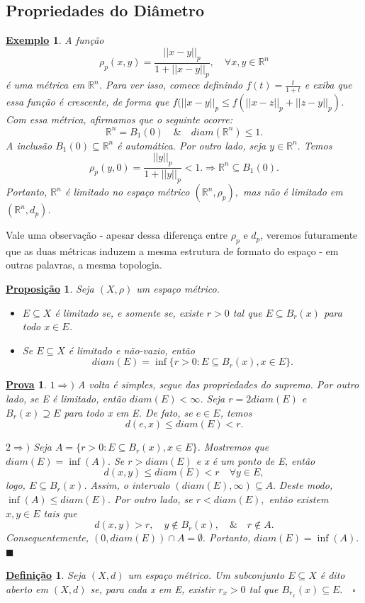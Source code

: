 \documentclass{article}
\newtheorem*{def*}{\underline{Defini\c c\~ao}}
\newtheorem*{prop*}{\underline{Proposi\c c\~ao}}
\newtheorem{example}{\underline{Exemplo}}
\newtheorem*{proof*}{\underline{Prova}}
\renewcommand\qedsymbol{$\blacksquare$}
\begin{document}
\subsection{Propriedades do Diâmetro}
 \begin{example}
   A função 
     \[
       \rho_{p}(x,y) = \frac{||x-y||_{p}}{1+||x-y||_{p}},\quad \forall x, y\in \mathbb{R}^{n}
     \]
     é uma métrica em \(\mathbb{R}^{n}\). Para ver isso, comece definindo \(f(t) = \frac{t}{1+t}\) e exiba que essa função é
crescente, de forma que \(f(||x-y||_{p}\leq f(||x-z||_{p}+||z-y||_{p})\). Com essa métrica, afirmamos que o seguinte ocorre: 
  \[
    \mathbb{R}^{n} = B_{1}(0)\quad\&\quad diam(\mathbb{R}^{n})\leq 1.
  \]
  A inclusão \(B_{1}(0)\subseteq{\mathbb{R}^{n}}\) é automática. Por outro lado, seja \(y\in \mathbb{R}^{n}.\) Temos 
    \[
      \rho_{p}(y, 0) = \frac{||y||_{p}}{1 + ||y||_{p}} < 1. \Rightarrow \mathbb{R}^{n}\subseteq{B_{1}(0)}.
    \]
  Portanto, \(\mathbb{R}^{n}\) é limitado no espaço métrico \((\mathbb{R}^{n}, \rho_{p}),\) mas não é limitado em \((\mathbb{R}^{n}, d_{p})\).
 \end{example}
 Vale uma observação - apesar dessa diferença entre \(\rho_{p}\) e \(d_{p}\), veremos futuramente que as duas métricas induzem a mesma
estrutura de formato do espaço - em outras palavras, a mesma topologia.
\begin{prop*}
  Seja \((X, \rho )\) um espaço métrico.
 \begin{itemize}
   \item[1)] \(E\subseteq{X}\) é limitado se, e somente se, existe \(r>0\) tal que \(E\subseteq{B_{r}(x)}\) para todo \(x\in E\).
     \item[2)] Se \(E\subseteq{X}\) é limitado e não-vazio, então 
       \[
         diam(E) = \inf\{r > 0: E \subseteq{B_{r}(x)}, x \in E\}.
       \]
 \end{itemize}
\end{prop*}
\begin{proof*}
  \(1 \Rightarrow )\) A volta é simples, segue das propriedades do supremo. Por outro lado, se E é limitado, então \(diam(E) < \infty\). Seja
 \(r=2diam(E)\) e \(B_{r}(x)\supseteq{E}\) para todo x em E. De fato, se \(e\in E\), temos 
   \[
     d(e, x)\leq diam(E) < r.
   \]

   \(2 \Rightarrow )\) Seja \(A = \{r>0: E \subseteq{B_{r}(x)}, x\in E\}\). Mostremos que \(diam(E) = \inf{(A)}.\) Se \(r > diam(E)\) e x
é um ponto de E, então 
  \[
    d(x, y)\leq diam(E) < r\quad \forall y\in E,
  \]
  logo, \(E\subseteq{B_{r}(x)}\). Assim, o intervalo \((diam(E), \infty)\subseteq{A}.\) Deste modo, \(\inf{(A)}\leq diam(E).\)
  Por outro lado, se \(r < diam(E),\) então existem \(x, y\in E\) tais que 
    \[
      d(x, y) > r,\quad y\not\in B_{r}(x),\quad \&\quad r\not\in A.
    \]
    Consequentemente, \((0, diam(E))\cap A = \emptyset.\) Portanto, \(diam(E) = \inf{(A)}.\) \qedsymbol 
\end{proof*}
\begin{def*}
  Seja \((X, d)\) um espaço métrico. Um subconjunto \(E\subseteq{X}\) é dito aberto em \((X, d)\) se, para cada
x em E, existir \(r_{x} > 0\) tal que \(B_{r_{x}}(x)\subseteq{E}.\quad\square\)
\end{def*}
\newpage
\end{document}
